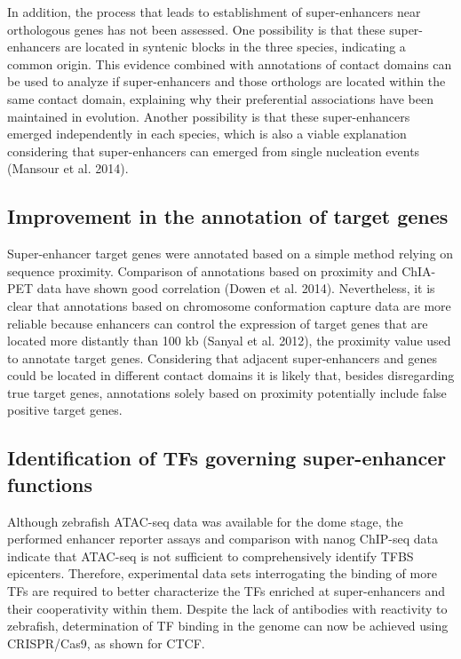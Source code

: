 In addition, the process that leads to establishment of super-enhancers near orthologous genes has not been assessed. One possibility is that these super-enhancers are located in syntenic blocks in the three species, indicating a common origin. This evidence combined with annotations of contact domains can be used to analyze if super-enhancers and those orthologs are located within the same contact domain, explaining why their preferential associations have been maintained in evolution. Another possibility is that these super-enhancers emerged independently in each species, which is also a viable explanation considering that super-enhancers can emerged from single nucleation events (Mansour et al. 2014).\\

		\subsection{Improvement in the annotation of target genes}

Super-enhancer target genes were annotated based on a simple method relying on sequence proximity. Comparison of annotations based on proximity and ChIA-PET data have shown good correlation (Dowen et al. 2014). Nevertheless, it is clear that annotations based on chromosome conformation capture data are more reliable because enhancers can control the expression of target genes that are located more distantly than 100 kb (Sanyal et al. 2012), the proximity value used to annotate target genes. Considering that adjacent super-enhancers and genes could be located in different contact domains it is likely that, besides disregarding true target genes, annotations solely based on proximity potentially include false positive target genes.\\

		\subsection{Identification of TFs governing super-enhancer functions}

Although zebrafish ATAC-seq data was available for the dome stage, the performed enhancer reporter assays and comparison with nanog ChIP-seq data indicate that ATAC-seq is not sufficient to comprehensively identify TFBS epicenters. Therefore, experimental data sets interrogating the binding of more TFs are required to better characterize the TFs enriched at super-enhancers and their cooperativity within them. Despite the lack of antibodies with reactivity to zebrafish, determination of TF binding in the genome can now be achieved using CRISPR/Cas9, as shown for CTCF.\\


